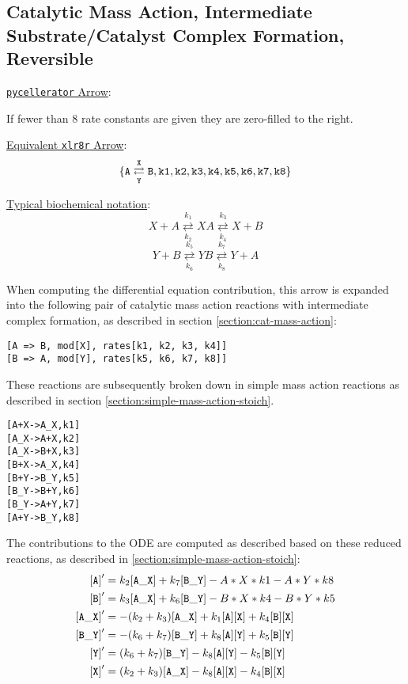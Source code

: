 \subsection{Catalytic Mass Action, Intermediate Substrate/Catalyst Complex Formation, Reversible}
\label{section:cat-mass-action-reversible}
\underline{{\tt pycellerator} Arrow}: \begin{center}
\fbox{\tt 
[A <=> B, mod[X, Y], rates[k1, k2, k3, k4, k5, k6, k7, k8]]
} 
\end{center}

If fewer than 8 rate constants are given they are zero-filled to the right. 

\underline{Equivalent {\tt xlr8r} Arrow}:
$$\tt\{A \underset{Y}{\overset{X}{\rightleftarrows}} B,k1,k2,k3,k4, k5, k6, k7, k8 \}$$

\underline{Typical biochemical notation}: 
$$ X+A\underset{k_2}{\overset{k_1}  \rightleftarrows } XA \underset{k_4}{ \overset{k_3}{\rightleftarrows}} X+B$$
$$ Y+B\underset{k_6}{\overset{k_5}  \rightleftarrows }  YB \underset{k_8}{ \overset{k_7}{\rightleftarrows}} Y+A$$

When computing the differential equation contribution, this arrow is expanded into the following pair of catalytic mass action reactions with intermediate complex formation, as described in section \ref{section:cat-mass-action}: 
\begin{center}
{\tt [A => B, mod[X], rates[k1, k2, k3, k4]]}\\
{\tt [B => A, mod[Y], rates[k5, k6, k7, k8]]}
\end{center}
These reactions are subsequently broken down in simple mass action reactions as described in section \ref{section:simple-mass-action-stoich}. 
\begin{center}
{\tt [A+X->A\_X,k1]}\\
{\tt [A\_X->A+X,k2]}\\
{\tt [A\_X->B+X,k3]}\\
{\tt [B+X->A\_X,k4]}\\
{\tt [B+Y->B\_Y,k5]}\\
{\tt [B\_Y->B+Y,k6]}\\
{\tt [B\_Y->A+Y,k7]}\\
{\tt [A+Y->B\_Y,k8]}
\end{center}
The contributions to the ODE are computed as described based on these reduced reactions, as described in \ref{section:simple-mass-action-stoich}: 
\begin{align*}
{\tt [A]}'    &=  k_2{\tt [A\_X]} + k_7{\tt [B\_Y]} - A*X*k1 - A*Y*k8\\
{\tt [B]}'    &=  k_3{\tt [A\_X]} + k_6{\tt [B\_Y]} - B*X*k4 - B*Y*k5\\
{\tt [A\_X]}' &= -(k_2+k_3){\tt [A\_X]} + k_1{\tt [A][X]} + k_4{\tt [B][X]}\\
{\tt [B\_Y]}' &= -(k_6+k_7){\tt [B\_Y]} + k_8{\tt [A][Y]} + k_5{\tt [B][Y]}\\
{\tt [Y]}'    &=  (k_6+k_7){\tt [B\_Y]} - k_8{\tt [A][Y]} - k_5{\tt [B][Y]}\\
{\tt [X]}   ' &=  (k_2+k_3){\tt [A\_X]} - k_8{\tt [A][X]} - k_4{\tt [B][X]}
\end{align*}


